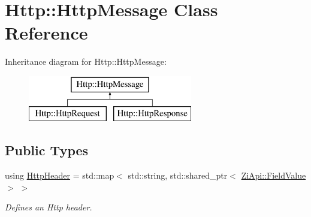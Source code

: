 \hypertarget{classHttp_1_1HttpMessage}{}\section{Http\+::Http\+Message Class Reference}
\label{classHttp_1_1HttpMessage}
Inheritance diagram for Http\+::Http\+Message\+:\begin{figure}[H]
\begin{center}
\leavevmode
\includegraphics[height=2.000000cm]{classHttp_1_1HttpMessage}
\end{center}
\end{figure}
\subsection*{Public Types}
\begin{DoxyCompactItemize}
\item 
using \mbox{\hyperlink{classHttp_1_1HttpMessage_a48fdadff82b4d5d227480a43166d008f}{Http\+Header}} = std\+::map$<$ std\+::string, std\+::shared\+\_\+ptr$<$ \mbox{\hyperlink{classZiApi_1_1FieldValue}{Zi\+Api\+::\+Field\+Value}} $>$ $>$
\begin{DoxyCompactList}\small\item\em Defines an Http header. \end{DoxyCompactList}\end{DoxyCompactItemize}
